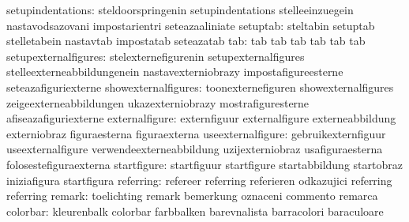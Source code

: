                setupindentations: steldoorspringenin               setupindentations
                                  stelleeinzuegein                 nastavodsazovani
                                  impostarientri                   seteazaaliniate
                        setuptab: steltabin                        setuptab
                                  stelletabein                     nastavtab
                                  impostatab                       seteazatab
                             tab: tab                              tab
                                  tab                              tab
                                  tab                              tab
            setupexternalfigures: stelexternefigurenin             setupexternalfigures
                                  stelleexterneabbildungenein      nastavexterniobrazy
                                  impostafigureesterne             seteazafiguriexterne
             showexternalfigures: toonexternefiguren               showexternalfigures
                                  zeigeexterneabbildungen          ukazexterniobrazy
                                  mostrafiguresterne               afiseazafiguriexterne
                  externalfigure: externfiguur                     externalfigure
                                  externeabbildung                 externiobraz
                                  figuraesterna                    figuraexterna
               useexternalfigure: gebruikexternfiguur              useexternalfigure
                                  verwendeexterneabbildung         uzijexterniobraz
                                  usafiguraesterna                 folosestefiguraexterna
                     startfigure: startfiguur                      startfigure
                                  startabbildung                   startobraz
                                  iniziafigura                     startfigura
                       referring: refereer                         referring
                                  referieren                       odkazujici
                                  referring                        referring %
                          remark: toelichting                      remark
                                  bemerkung                        oznaceni
                                  commento                         remarca
                        colorbar: kleurenbalk                      colorbar
                                  farbbalken                       barevnalista
                                  barracolori                      baraculoare
